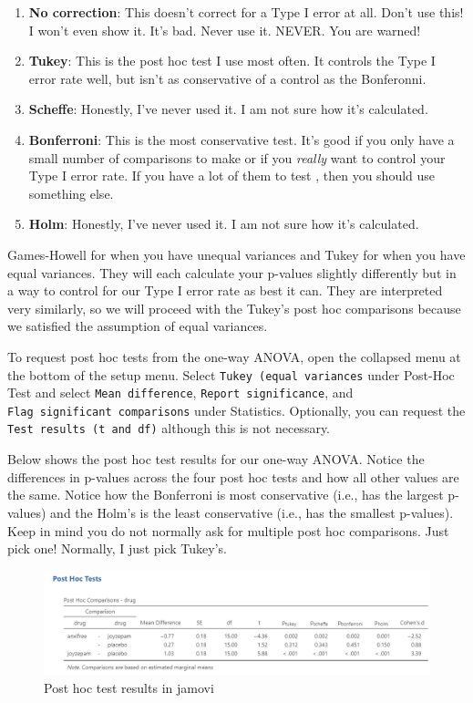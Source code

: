 \documentclass[
]{book}
\providecommand{\tightlist}{%
  \setlength{\itemsep}{0pt}\setlength{\parskip}{0pt}}
\begin{document}
\begin{enumerate}
\def\labelenumi{\arabic{enumi}.}
\tightlist
\item
  \textbf{No correction}: This doesn't correct for a Type I error at all. Don't use this! I won't even show it. It's bad. Never use it. NEVER. You are warned!
\item
  \textbf{Tukey}: This is the post hoc test I use most often. It controls the Type I error rate well, but isn't as conservative of a control as the Bonferonni.
\item
  \textbf{Scheffe}: Honestly, I've never used it. I am not sure how it's calculated.
\item
  \textbf{Bonferroni}: This is the most conservative test. It's good if you only have a small number of comparisons to make or if you \emph{really} want to control your Type I error rate. If you have a lot of them to test , then you should use something else.
\item
  \textbf{Holm}: Honestly, I've never used it. I am not sure how it's calculated.
\end{enumerate}

Games-Howell for when you have unequal variances and Tukey for when you have equal variances. They will each calculate your p-values slightly differently but in a way to control for our Type I error rate as best it can. They are interpreted very similarly, so we will proceed with the Tukey's post hoc comparisons because we satisfied the assumption of equal variances.

To request post hoc tests from the one-way ANOVA, open the collapsed menu at the bottom of the setup menu. Select \texttt{Tukey\ (equal\ variances} under Post-Hoc Test and select \texttt{Mean\ difference}, \texttt{Report\ significance}, and \texttt{Flag\ significant\ comparisons} under Statistics. Optionally, you can request the \texttt{Test\ results\ (t\ and\ df)} although this is not necessary.

Below shows the post hoc test results for our one-way ANOVA. Notice the differences in p-values across the four post hoc tests and how all other values are the same. Notice how the Bonferroni is most conservative (i.e., has the largest p-values) and the Holm's is the least conservative (i.e., has the smallest p-values). Keep in mind you do not normally ask for multiple post hoc comparisons. Just pick one! Normally, I just pick Tukey's.

\begin{figure}

{\centering \includegraphics[width=1\linewidth]{images/04_one-way-anova/one-way_results_post-hoc} 

}

\caption{Post hoc test results in jamovi}\label{fig:unnamed-chunk-7}
\end{figure}
\end{document}
